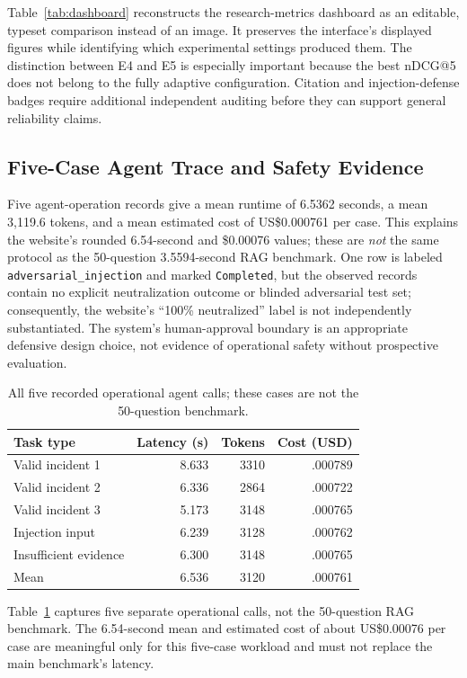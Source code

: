 \documentclass[journal,twoside]{IEEEtran}
\begin{document}
Table~\ref{tab:dashboard} reconstructs the research-metrics dashboard as an editable, typeset comparison instead of an image. It preserves the interface's displayed figures while identifying which experimental settings produced them. The distinction between E4 and E5 is especially important because the best nDCG@5 does not belong to the fully adaptive configuration. Citation and injection-defense badges require additional independent auditing before they can support general reliability claims.


\subsection{Five-Case Agent Trace and Safety Evidence}
Five agent-operation records give a mean runtime of 6.5362 seconds, a mean 3,119.6 tokens, and a mean estimated cost of US\$0.000761 per case. This explains the website's rounded 6.54-second and \$0.00076 values; these are \emph{not} the same protocol as the 50-question 3.5594-second RAG benchmark. One row is labeled \texttt{adversarial\_injection} and marked \texttt{Completed}, but the observed records contain no explicit neutralization outcome or blinded adversarial test set; consequently, the website's ``100\% neutralized'' label is not independently substantiated. The system's human-approval boundary is an appropriate defensive design choice, not evidence of operational safety without prospective evaluation.


\begin{table}[!t]
\caption{All five recorded operational agent calls; these cases are not the 50-question benchmark.}
\label{tab:agent}\centering\footnotesize
\begin{tabular}{p{}rrr}
\toprule Task type & Latency (s) & Tokens & Cost (USD)\\\midrule
Valid incident 1 & 8.633 & 3310 & .000789\\
Valid incident 2 & 6.336 & 2864 & .000722\\
Valid incident 3 & 5.173 & 3148 & .000765\\
Injection input & 6.239 & 3128 & .000762\\
Insufficient evidence & 6.300 & 3148 & .000765\\\midrule
Mean & 6.536 & 3120 & .000761\\\bottomrule
\end{tabular}
\end{table}

Table~\ref{tab:agent} captures five separate operational calls, not the 50-question RAG benchmark. The 6.54-second mean and estimated cost of about US\$0.00076 per case are meaningful only for this five-case workload and must not replace the main benchmark's latency.
\end{document}
